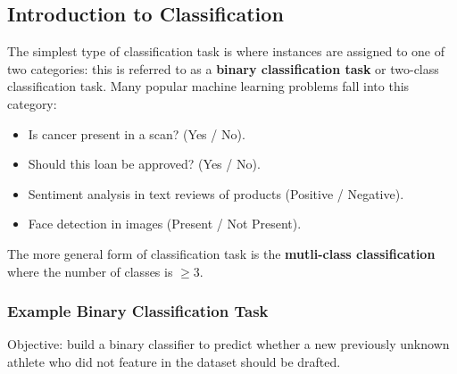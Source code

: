 \documentclass[a4paper,11pt]{article}
\begin{document}
\subsection{Introduction to Classification}
The simplest type of classification task is where instances are assigned to one of two categories: this is referred
to as a \textbf{binary classification task} or two-class classification task.
Many popular machine learning problems fall into this category:
\begin{itemize}
    \item   Is cancer present in a scan? (Yes / No).
    \item   Should this loan be approved? (Yes / No).
    \item   Sentiment analysis in text reviews of products (Positive / Negative).
    \item   Face detection in images (Present / Not Present).
\end{itemize}

The more general form of classification task is the \textbf{mutli-class classification} where the number of classes
is $\geq 3$.

\subsubsection{Example Binary Classification Task}
Objective: build a binary classifier to predict whether a new previously unknown athlete who did not feature in the 
dataset should be drafted.
\end{document}
